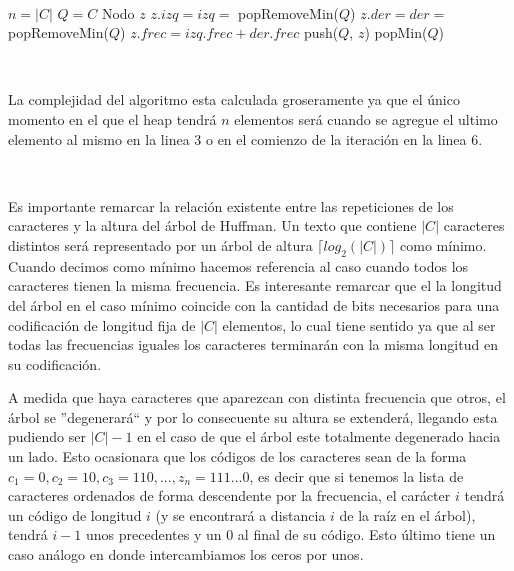 \documentclass[10pt, a4paper]{report}
\begin{document}
~

\begin{algorithmic}[1]
    \State $n = |C|$
    \State $Q = C$ 
      \State Nodo $z$
      \State $z.izq = izq = $ popRemoveMin($Q$) 
      \State $z.der = der = $ popRemoveMin($Q$) 
      \State $z.frec = izq.frec + der.frec$
      \State push($Q$, $z$) 
    \EndFor
    \State \Return popMin($Q$) 
 \EndFunction {}
\end{algorithmic}

~

La complejidad del algoritmo esta calculada groseramente ya que el \'unico momento en el que el heap tendr\'a $n$ elementos ser\'a cuando se agregue el ultimo elemento al mismo en la linea $3$ o en el comienzo de la iteraci\'on en la linea $6$.

~

Es importante remarcar la relaci\'on existente entre las repeticiones de los caracteres y la altura del \'arbol de Huffman. Un texto que contiene $|C|$ caracteres distintos ser\'a representado por un \'arbol de altura $\lceil log_2(|C|) \rceil$ como m\'inimo. Cuando decimos como m\'inimo hacemos referencia al caso cuando todos los caracteres tienen la misma frecuencia. Es interesante remarcar que el la longitud del \'arbol en el caso m\'inimo coincide con la cantidad de bits necesarios para una codificaci\'on de longitud fija de $|C|$ elementos, lo cual tiene sentido ya que al ser todas las frecuencias iguales los caracteres terminar\'an con la misma longitud en su codificaci\'on. 

A medida que haya caracteres que aparezcan con distinta frecuencia que otros, el \'arbol se ''degenerar\'a`` y por lo consecuente su altura se extender\'a, llegando esta pudiendo ser $|C|-1$ en el caso de que el \'arbol este totalmente degenerado hacia un lado. Esto ocasionara que los c\'odigos de los caracteres sean de la forma $c_1=0, c_2=10, c_3=110, ... , z_n = 111...0$, es decir que si tenemos la lista de caracteres ordenados de forma descendente por la frecuencia, el car\'acter $i$ tendr\'a un c\'odigo de longitud $i$ (y se encontrar\'a a distancia $i$ de la ra\'iz en el \'arbol), tendr\'a $i-1$ unos precedentes y un $0$ al final de su c\'odigo. Esto \'ultimo tiene un caso an\'alogo en donde intercambiamos los ceros por unos.
\end{document}
